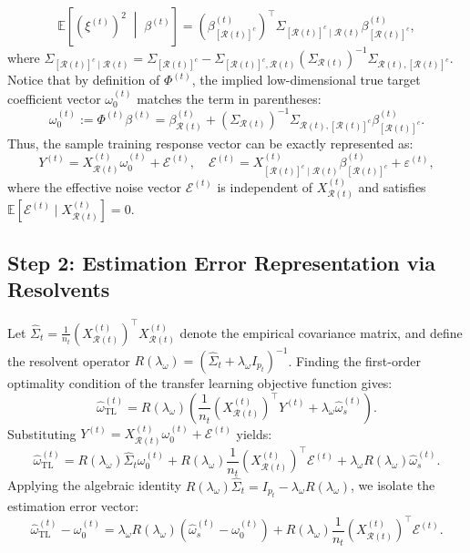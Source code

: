 \documentclass{article}
\begin{document}
\begin{equation}
\mathbb{E}\left[ (\xi^{(t)})^2 \;\middle|\; \beta^{(t)} \right] = \left(\beta^{(t)}_{[\mathcal{R}(t)]^c}\right)^\top \Sigma_{[\mathcal{R}(t)]^c \mid \mathcal{R}(t)} \beta^{(t)}_{[\mathcal{R}(t)]^c},
\end{equation}
where $\Sigma_{[\mathcal{R}(t)]^c \mid \mathcal{R}(t)} = \Sigma_{[\mathcal{R}(t)]^c} - \Sigma_{[\mathcal{R}(t)]^c, \mathcal{R}(t)} \left(\Sigma_{\mathcal{R}(t)}\right)^{-1} \Sigma_{\mathcal{R}(t), [\mathcal{R}(t)]^c}$. Notice that by definition of $\Phi^{(t)}$, the implied low-dimensional true target coefficient vector $\omega_0^{(t)}$ matches the term in parentheses:
\begin{equation}
\omega_0^{(t)} := \Phi^{(t)} \beta^{(t)} = \beta^{(t)}_{\mathcal{R}(t)} + \left(\Sigma_{\mathcal{R}(t)}\right)^{-1} \Sigma_{\mathcal{R}(t), [\mathcal{R}(t)]^c} \beta^{(t)}_{[\mathcal{R}(t)]^c}.
\end{equation}
Thus, the sample training response vector can be exactly represented as:
\begin{equation}
Y^{(t)} = X^{(t)}_{\mathcal{R}(t)} \omega_0^{(t)} + \mathcal{E}^{(t)}, \quad \mathcal{E}^{(t)} = X^{(t)}_{[\mathcal{R}(t)]^c \mid \mathcal{R}(t)} \beta^{(t)}_{[\mathcal{R}(t)]^c} + \varepsilon^{(t)},
\end{equation}
where the effective noise vector $\mathcal{E}^{(t)}$ is independent of $X^{(t)}_{\mathcal{R}(t)}$ and satisfies $\mathbb{E}[\mathcal{E}^{(t)} \mid X^{(t)}_{\mathcal{R}(t)}] = 0$.

\subsection{Step 2: Estimation Error Representation via Resolvents}
Let $\hat\Sigma_t = \frac{1}{n_t} (X^{(t)}_{\mathcal{R}(t)})^\top X^{(t)}_{\mathcal{R}(t)}$ denote the empirical covariance matrix, and define the resolvent operator $R(\lambda_\omega) = (\hat\Sigma_t + \lambda_\omega I_{p_t})^{-1}$. Finding the first-order optimality condition of the transfer learning objective function gives:
\begin{equation}
\hat\omega_{\mathrm{TL}}^{(t)} = R(\lambda_\omega) \left( \frac{1}{n_t} (X^{(t)}_{\mathcal{R}(t)})^\top Y^{(t)} + \lambda_\omega \hat\omega_s^{(t)} \right).
\end{equation}
Substituting $Y^{(t)} = X^{(t)}_{\mathcal{R}(t)} \omega_0^{(t)} + \mathcal{E}^{(t)}$ yields:
\begin{equation}
\hat\omega_{\mathrm{TL}}^{(t)} = R(\lambda_\omega) \hat\Sigma_t \omega_0^{(t)} + R(\lambda_\omega) \frac{1}{n_t} (X^{(t)}_{\mathcal{R}(t)})^\top \mathcal{E}^{(t)} + \lambda_\omega R(\lambda_\omega) \hat\omega_s^{(t)}.
\end{equation}
Applying the algebraic identity $R(\lambda_\omega) \hat\Sigma_t = I_{p_t} - \lambda_\omega R(\lambda_\omega)$, we isolate the estimation error vector:
\begin{equation}
\hat\omega_{\mathrm{TL}}^{(t)} - \omega_0^{(t)} = \lambda_\omega R(\lambda_\omega) (\hat\omega_s^{(t)} - \omega_0^{(t)}) + R(\lambda_\omega) \frac{1}{n_t} (X^{(t)}_{\mathcal{R}(t)})^\top \mathcal{E}^{(t)}.
\end{equation}
\end{document}
